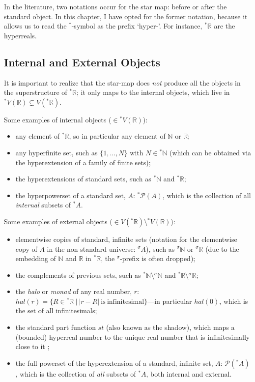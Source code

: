In the literature, two notations occur for the star map: before or after the standard object. In this chapter, I have opted for the former notation, because it allows us to read the $^\ast$-symbol as the prefix `hyper-'. For instance, ${^\ast \mathbb{R}}$ are the hyperreals.


\subsection{Internal and External Objects}\label{sec:intext}

It is important to realize that the star-map does \emph{not} produce all the objects in the superstructure of ${^\ast \mathbb{R}}$; it only maps to the internal objects, which live in  ${^\ast V}(\mathbb{R}) \subsetneq V({^\ast \mathbb{R}})$.

Some examples of internal objects ($\in {^\ast V}(\mathbb{R})$):
\begin{itemize}
  \item any element of ${^\ast \mathbb{R}}$, so in particular any element of $\mathbb{N}$ or $\mathbb{R}$;
  \item any hyperfinite set, such as $\{ 1, \ldots, N \}$ with $N \in {^\ast \mathbb{N}}$ (which can be obtained via the hyperextension of a family of finite sets);
  \item the hyperextensions of standard sets, such as ${^\ast \mathbb{N}}$ and ${^\ast \mathbb{R}}$;
  \item the hyperpowerset of a standard set, $A$: ${^\ast \mathcal{P}}(A)$, which is the collection of all \emph{internal} subsets of ${^\ast A}$.
\end{itemize}

\noindent Some examples of external objects ($\in V({^\ast \mathbb{R}}) \setminus {^\ast V}(\mathbb{R})$):
\begin{itemize}
  \item elementwise copies of standard, infinite sets (notation for the elementwise copy of $A$ in the non-standard universe: ${^\sigma A}$), such as ${^\sigma \mathbb{N}}$ or ${^\sigma \mathbb{R}}$ (due to the embedding of $\mathbb{N}$ and $\mathbb{R}$ in ${^\ast \mathbb{R}}$, the $^\sigma$-prefix is often dropped);
  \item the complements of previous sets, such as ${^\ast \mathbb{N}} \setminus {^\sigma \mathbb{N}}$ and ${^\ast \mathbb{R}} \setminus {^\sigma \mathbb{R}}$;
  \item the \textit{halo} or \textit{monad} of any real number, $r$: $hal(r) = \{ R \in {^\ast \mathbb{R}}\ |\ |r - R| \mathrm{\ is\ infinitesimal} \}$---in particular $hal(0)$, which is the set of all infinitesimals;
  \item the standard part function $st$ (also known as the shadow), which maps a (bounded) hyperreal number to the unique real number that is infinitesimally close to it \citep[section~5.6]{Goldblatt:1998};
  \item the full powerset of the hyperextension of a standard, infinite set, $A$: $\mathcal{P}({^\ast A})$, which is the collection of \emph{all} subsets of ${^\ast A}$, both internal and external.
\end{itemize}

